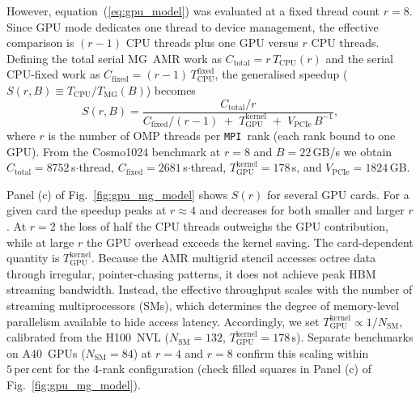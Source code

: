 \documentclass[fleqn,usenatbib]{mnras}
\newcommand{\mpi}[0]{\texttt{MPI}}
\begin{document}
However, equation~(\ref{eq:gpu_model}) was evaluated at a fixed thread count $r = 8$.  Since GPU mode dedicates one thread to device management, the effective comparison is $(r{-}1)$ CPU threads plus one GPU versus $r$ CPU threads.  Defining the total serial MG~AMR work as $C_{\mathrm{total}} = r \, T_{\mathrm{CPU}}(r)$ and the serial CPU-fixed work as $C_{\mathrm{fixed}} = (r{-}1)\, T_{\mathrm{CPU}}^{\mathrm{fixed}}$, the generalised speedup ($S(r,B)\equiv T_\mathrm{CPU}/T_\mathrm{MG}(B)$) becomes
\begin{equation} 
S(r, B) = \frac{C_{\mathrm{total}} / r}
  {C_{\mathrm{fixed}} / (r{-}1) \;+\; T_{\mathrm{GPU}}^{\mathrm{kernel}}
   \;+\; V_{\mathrm{PCIe}} \, B^{-1}},
\label{eq:gpu_model_r}
\end{equation}
where $r$ is the number of OMP threads per \mpi\ rank (each rank bound to one GPU).  From the Cosmo1024 benchmark at $r = 8$ and $B = 22$\,GB/s we obtain $C_{\mathrm{total}} = 8752$\,s$\cdot$thread, $C_{\mathrm{fixed}} = 2681$\,s$\cdot$thread, $T_{\mathrm{GPU}}^{\mathrm{kernel}} = 178$\,s, and $V_{\mathrm{PCIe}} = 1824$\,GB.

Panel (c) of Fig.~\ref{fig:gpu_mg_model} shows $S(r)$ for several
GPU cards.  For a given card the speedup peaks at $r \approx 4$
and decreases for both smaller and larger $r$. At $r = 2$ the loss
of half the CPU threads outweighs the GPU contribution, while at
large $r$ the GPU overhead exceeds the kernel saving.
The card-dependent quantity is $T_{\mathrm{GPU}}^{\mathrm{kernel}}$.
Because the AMR multigrid stencil accesses octree data through
irregular, pointer-chasing patterns, it does not achieve peak HBM
streaming bandwidth. Instead, the effective throughput scales with
the number of streaming multiprocessors (SMs), which determines
the degree of memory-level parallelism available to hide access
latency.  Accordingly, we set
$T_{\mathrm{GPU}}^{\mathrm{kernel}} \propto 1 / N_{\mathrm{SM}}$,
calibrated from the H100~NVL ($N_{\mathrm{SM}} = 132$,
$T_{\mathrm{GPU}}^{\mathrm{kernel}} = 178$\,s).
Separate benchmarks on A40~GPUs ($N_{\mathrm{SM}} = 84$) at $r = 4$
and $r = 8$ confirm this scaling within $5\,\mathrm{per\,cent}$ for the
4-rank configuration (check filled squares in Panel (c) of Fig.~\ref{fig:gpu_mg_model}).
\end{document}
